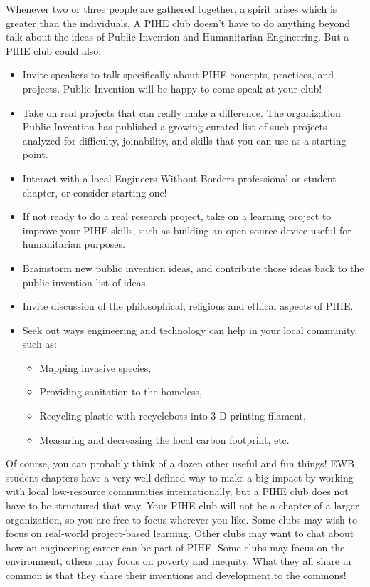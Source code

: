 \documentclass[
	fontsize=10pt, %
	twoside=false, %
	secnumdepth=1, %
]{kaobook}
\begin{document}
Whenever two or three people are gathered together, a spirit arises which is greater than the individuals. A PIHE club doesn’t have to do anything beyond talk about the ideas of Public Invention and Humanitarian Engineering. But a PIHE club could also:
\begin{itemize}
\item Invite speakers to talk specifically about PIHE concepts, practices, and projects. Public Invention will be happy to come speak at your club!
\item Take on real projects that can really make a difference. The organization Public Invention has published a growing curated list of such projects analyzed for difficulty, joinability, and skills that you can use as a starting point.
\item Interact with a local Engineers Without Borders professional or student chapter, or consider starting one!
\item If not ready to do a real research project, take on a learning project to improve your PIHE skills, such as building an open-source device useful for humanitarian purposes.
\item Brainstorm new public invention ideas, and contribute those ideas back to the public invention list of ideas.
\item Invite discussion of the philosophical, religious and ethical aspects of PIHE.
\item Seek out ways engineering and technology can help in your local community, such as:
  \begin{itemize}
  \item Mapping invasive species,
  \item Providing sanitation to the homeless,
  \item Recycling plastic with recyclebots into 3-D printing filament,
  \item Measuring and decreasing the local carbon footprint, etc.
  \end{itemize}
\end{itemize}

Of course, you can probably think of a dozen other useful and fun things! EWB student chapters have a very well-defined way to make a big impact by working with local low-resource communities internationally, but a PIHE club does not have to be structured that way. Your PIHE club will not be a chapter of a larger organization, so you are free to focus wherever you like. Some clubs may wish to focus on real-world project-based learning. Other clubs may want to chat about how an engineering career can be part of PIHE. Some clubs may focus on the environment, others may focus on poverty and inequity. What they all share in common is that they share their inventions and development to the commons!
\end{document}
